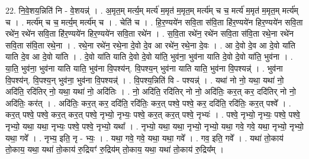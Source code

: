 \documentclass[17pt]{extarticle}
\begin{document}
22. नि॒वे॒शय॒न्निति॑ नि - वे॒शयन्न्॑ । . अ॒मृत॒म् मर्त्य॒म् मर्त्य॑ म॒मृत॑ म॒मृत॒म् मर्त्य॑म् च च॒ मर्त्य॑ म॒मृत॑ म॒मृत॒म् मर्त्य॑म् च । . मर्त्य॑म् च च॒ मर्त्य॒म् मर्त्य॑म् च । . चेति॑ च । . हि॒र॒ण्यये॑न सवि॒ता स॑वि॒ता हि॑र॒ण्यये॑न हिर॒ण्यये॑न सवि॒ता रथे॑न॒ रथे॑न सवि॒ता हि॑र॒ण्यये॑न हिर॒ण्यये॑न सवि॒ता रथे॑न । . स॒वि॒ता रथे॑न॒ रथे॑न सवि॒ता स॑वि॒ता रथे॒ना रथे॑न सवि॒ता स॑वि॒ता रथे॒ना । . रथे॒ना रथे॑न॒ रथे॒ना दे॒वो दे॒व आ रथे॑न॒ रथे॒ना दे॒वः । . आ दे॒वो दे॒व आ दे॒वो या॑ति याति दे॒व आ दे॒वो या॑ति । . दे॒वो या॑ति याति दे॒वो दे॒वो या॑ति॒ भुव॑ना॒ भुव॑ना याति दे॒वो दे॒वो या॑ति॒ भुव॑ना । . या॒ति॒ भुव॑ना॒ भुव॑ना याति याति॒ भुव॑ना वि॒पश्य॑न्. वि॒पश्य॒न् भुव॑ना याति याति॒ भुव॑ना वि॒पश्यन्न्॑ । . भुव॑ना वि॒पश्य॑न्. वि॒पश्य॒न् भुव॑ना॒ भुव॑ना वि॒पश्यन्न्॑ । . वि॒पश्य॒न्निति॑ वि - पश्यन्न्॑ । . यथा॑ नो नो॒ यथा॒ यथा॑ नो॒ अदि॑ति॒ रदि॑तिर् नो॒ यथा॒ यथा॑ नो॒ अदि॑तिः । . नो॒ अदि॑ति॒ रदि॑तिर् नो नो॒ अदि॑तिः॒ कर॒त् कर॒ ददि॑तिर् नो नो॒ अदि॑तिः॒ कर॑त् । . अदि॑तिः॒ कर॒त् कर॒ ददि॑ति॒ रदि॑तिः॒ कर॒त् पश्वे॒ पश्वे॒ कर॒ ददि॑ति॒ रदि॑तिः॒ कर॒त् पश्वे᳚ । . कर॒त् पश्वे॒ पश्वे॒ कर॒त् कर॒त् पश्वे॒ नृभ्यो॒ नृभ्यः॒ पश्वे॒ कर॒त् कर॒त् पश्वे॒ नृभ्यः॑ । . पश्वे॒ नृभ्यो॒ नृभ्यः॒ पश्वे॒ पश्वे॒ नृभ्यो॒ यथा॒ यथा॒ नृभ्यः॒ पश्वे॒ पश्वे॒ नृभ्यो॒ यथा᳚ । . नृभ्यो॒ यथा॒ यथा॒ नृभ्यो॒ नृभ्यो॒ यथा॒ गवे॒ गवे॒ यथा॒ नृभ्यो॒ नृभ्यो॒ यथा॒ गवे᳚ । . नृभ्य॒ इति॒ नृ - भ्यः॒ । . यथा॒ गवे॒ गवे॒ यथा॒ यथा॒ गवे᳚ । . गव॒ इति॒ गवे᳚ । . यथा॑ तो॒काय॑ तो॒काय॒ यथा॒ यथा॑ तो॒काय॑ रु॒द्रियꣳ॑ रु॒द्रिय॑म् तो॒काय॒ यथा॒ यथा॑ तो॒काय॑ रु॒द्रिय᳚म् । \newline
\end{document}
